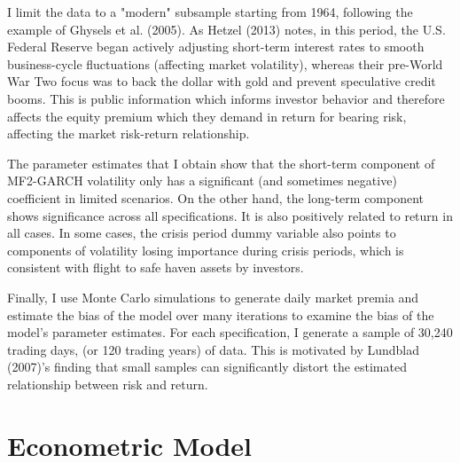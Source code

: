 \documentclass[12pt]{article}
\begin{document}
I limit the data to a "modern" subsample starting from 1964, following the example of Ghysels et al. (2005). As Hetzel (2013) notes, in this period, the U.S. Federal Reserve began actively adjusting short-term interest rates to smooth business-cycle fluctuations (affecting market volatility), whereas their pre-World War Two focus was to back the dollar with gold and prevent speculative credit booms. This is public information which informs investor behavior and therefore affects the equity premium which they demand in return for bearing risk, affecting the market risk-return relationship.\par
The parameter estimates that I obtain show that the short-term component of MF2-GARCH volatility only has a significant (and sometimes negative) coefficient in limited scenarios. On the other hand, the long-term component shows significance across all specifications. It is also positively related to return in all cases. In some cases, the crisis period dummy variable also points to components of volatility losing importance during crisis periods, which is consistent with flight to safe haven assets by investors.\par
Finally, I use Monte Carlo simulations to generate daily market premia and estimate the bias of the model over many iterations to examine the bias of the model's parameter estimates. For each specification, I generate a sample of 30,240 trading  days, (or 120 trading years) of data. This is motivated by Lundblad (2007)'s finding that small samples can significantly distort the estimated relationship between risk and return.\par


\section{Econometric Model}
\end{document}

